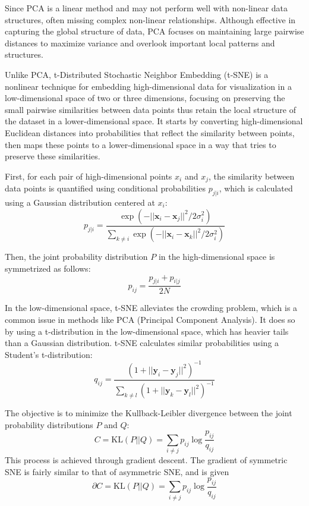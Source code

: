 \documentclass{article}\usepackage[]{graphicx}\usepackage[]{xcolor}
\numberwithin{equation}{section}
\begin{document}
{Since PCA is a linear method and may not perform well with non-linear data structures, often missing complex non-linear relationships. Although effective in capturing the global structure of data, PCA focuses on maintaining large pairwise distances to maximize variance and overlook important local patterns and structures. 

Unlike PCA, t-Distributed Stochastic Neighbor Embedding (t-SNE) is a nonlinear technique for embedding high-dimensional data for visualization in a low-dimensional space of two or three dimensions, focusing on preserving the small pairwise similarities between data points thus retain the local structure of the dataset in a lower-dimensional space. It starts by converting high-dimensional Euclidean distances into probabilities that reflect the similarity between points, then maps these points to a lower-dimensional space in a way that tries to preserve these similarities.


First, for each pair of high-dimensional points $x_i$ and $x_j$, the similarity between data points is quantified using conditional probabilities $p_{j|i}$, which is calculated using a Gaussian distribution centered at $x_i$:
    \begin{equation}
        p_{j|i} = \frac{\exp(-||\mathbf{x}_i - \mathbf{x}_j||^2 / 2\sigma_i^2)}{\sum_{k \neq i}\exp(-||\mathbf{x}_i - \mathbf{x}_k||^2 / 2\sigma_i^2)}
    \end{equation}


Then, the joint probability distribution $P$ in the high-dimensional space is symmetrized as follows:
    \begin{equation}
        p_{ij} = \frac{p_{j|i} + p_{i|j}}{2N}
    \end{equation}

In the low-dimensional space, t-SNE alleviates the crowding problem, which is a common issue in methods like PCA (Principal Component Analysis). It does so by using a t-distribution in the low-dimensional space, which has heavier tails than a Gaussian distribution. t-SNE calculates similar probabilities using a Student's t-distribution:
    \begin{equation}
        q_{ij} = \frac{(1 + ||\mathbf{y}_i - \mathbf{y}_j||^2)^{-1}}{\sum_{k \neq l}(1 + ||\mathbf{y}_k - \mathbf{y}_l||^2)^{-1}}
    \end{equation}

The objective is to minimize the Kullback-Leibler divergence between the joint probability distributions $P$ and $Q$:
    \begin{equation}
        C = \text{KL}(P || Q) = \sum_{i \neq j} p_{ij} \log \frac{p_{ij}}{q_{ij}}
    \end{equation}
This process is achieved through gradient descent. The gradient of symmetric SNE is fairly similar to that of asymmetric SNE, and is given 
\begin{equation}
        \partial C = \text{KL}(P || Q) = \sum_{i \neq j} p_{ij} \log \frac{p_{ij}}{q_{ij}}
    \end{equation}

}
\end{document}
